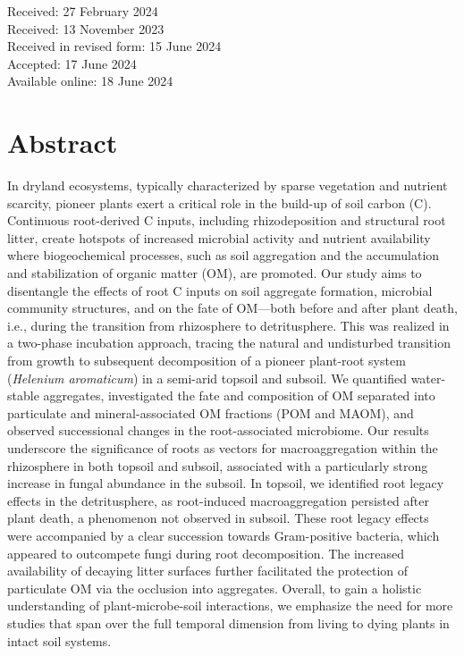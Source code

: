   \vspace{0.5cm}
  \begin{center}
    Received: 27 February 2024\\
    Received: 13 November 2023\\ 
    Received in revised form: 15 June 2024\\
    Accepted: 17 June 2024\\
    Available online: 18 June 2024
  \end{center}
  \cleardoublepage

\section*{Abstract}

In dryland ecosystems, typically characterized by sparse vegetation and nutrient scarcity, pioneer plants exert a critical role in the build-up of soil carbon (C). Continuous root-derived C inputs, including rhizodeposition and structural root litter, create hotspots of increased microbial activity and nutrient availability where biogeochemical processes, such as soil aggregation and the accumulation and stabilization of organic matter (OM), are promoted. Our study aims to disentangle the effects of root C inputs on soil aggregate formation, microbial community structures, and on the fate of OM—both before and after plant death, i.e., during the transition from rhizosphere to detritusphere. This was realized in a two-phase incubation approach, tracing the natural and undisturbed transition from growth to subsequent decomposition of a pioneer plant-root system (\textit{Helenium aromaticum}) in a semi-arid topsoil and subsoil. We quantified water-stable aggregates, investigated the fate and composition of OM separated into particulate and mineral-associated OM fractions (POM and MAOM), and observed successional changes in the root-associated microbiome. Our results underscore the significance of roots as vectors for macroaggregation within the rhizosphere in both topsoil and subsoil, associated with a particularly strong increase in fungal abundance in the subsoil. In topsoil, we identified root legacy effects in the detritusphere, as root-induced macroaggregation persisted after plant death, a phenomenon not observed in subsoil. These root legacy effects were accompanied by a clear succession towards Gram-positive bacteria, which appeared to outcompete fungi during root decomposition. The increased availability of decaying litter surfaces further facilitated the protection of particulate OM via the occlusion into aggregates. Overall, to gain a holistic understanding of plant-microbe-soil interactions, we emphasize the need for more studies that span over the full temporal dimension from living to dying plants in intact soil systems.

